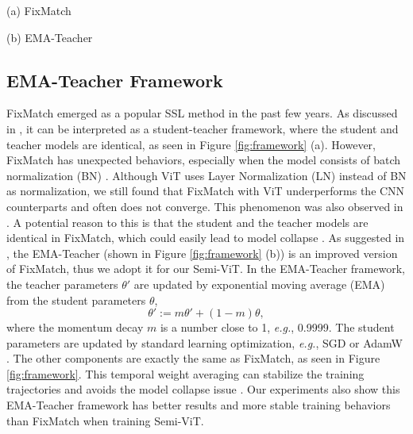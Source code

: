 \documentclass{article}
\newcommand\eg{\emph{e.g.}}
\begin{document}
\begin{figure*}[t]
\begin{minipage}[b]{.49\linewidth}
\centering
\centerline{}{(a) FixMatch}
\end{minipage}
\hfill
\begin{minipage}[b]{.49\linewidth}
\centering
\centerline{}{(b) EMA-Teacher}
\end{minipage}
\caption{The framework comparison between FixMatch (a) and EMA-Teacher (b). $x_s$/$x_w$ is the strongly/weakly augmented view of a sample $x$, and $\theta$ is the model parameters.}
\label{fig:framework}\end{figure*}

\subsection{EMA-Teacher Framework}

FixMatch \cite{DBLP:conf/nips/SohnBCZZRCKL20} emerged as a popular SSL method in the past few years. As discussed in \cite{DBLP:conf/cvpr/CaiRMFTS21}, it can be interpreted as a student-teacher framework, where the student and teacher models are identical, as seen in Figure \ref{fig:framework} (a). 
However, FixMatch has unexpected behaviors, especially when the model consists of batch normalization (BN) \cite{DBLP:conf/icml/IoffeS15}. Although ViT uses Layer Normalization (LN) \cite{DBLP:journals/corr/BaKH16} instead of BN as normalization, we still found that FixMatch with ViT underperforms the CNN counterparts and often does not converge. This phenomenon was also observed in \cite{weng2021semi}. A potential reason to this is that the student and the teacher models are identical in FixMatch, which could easily lead to model collapse \cite{DBLP:conf/cvpr/He0WXG20,DBLP:conf/nips/GrillSATRBDPGAP20}. As suggested in \cite{DBLP:conf/cvpr/CaiRMFTS21}, the EMA-Teacher (shown in Figure \ref{fig:framework} (b)) is an improved version of FixMatch, thus we adopt it for our Semi-ViT. In the EMA-Teacher framework, the teacher parameters $\theta'$ are updated by exponential moving average (EMA) from the student parameters $\theta$, 
\begin{equation}
    \theta':=m\theta'+(1-m)\theta,
\label{equ:ema update}
\end{equation}
where the momentum decay $m$ is a number close to 1, \eg, 0.9999. The student parameters are updated by standard learning optimization, \eg, SGD or AdamW \cite{DBLP:conf/iclr/LoshchilovH19}. The other components are exactly the same as FixMatch, as seen in Figure \ref{fig:framework}. This temporal weight averaging can stabilize the training trajectories \cite{DBLP:conf/iclr/AthiwaratkunFIW19,DBLP:conf/uai/IzmailovPGVW18} and avoids the model collapse issue \cite{DBLP:conf/cvpr/He0WXG20,DBLP:conf/nips/GrillSATRBDPGAP20}. Our experiments also show this EMA-Teacher framework has better results and more stable training behaviors than FixMatch when training Semi-ViT. 
\end{document}
